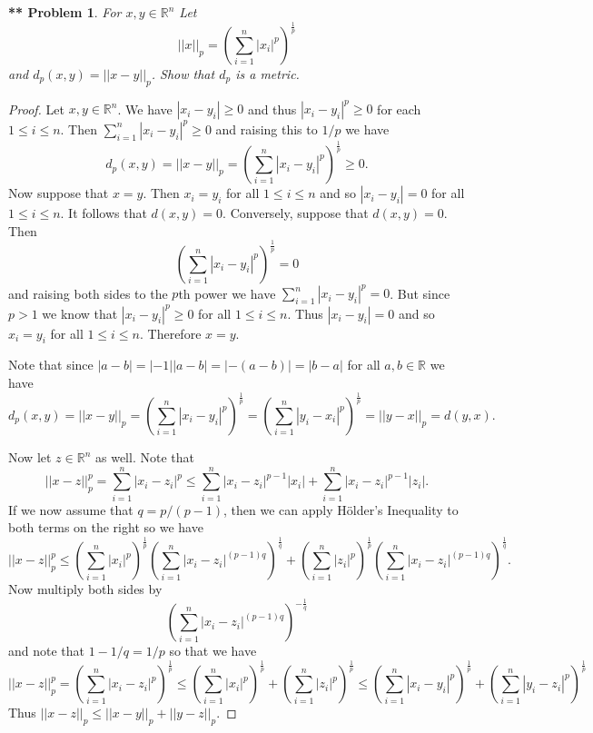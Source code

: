 \documentclass{article}
\newtheorem{**}{** Problem}
\begin{document}
\begin{flushleft}
\begin{**}
For $x, y \in \mathbb{R}^n$ Let
\[
||x||_p = \left ( \sum_{i=1}^{n} |x_i|^p \right )^{\frac{1}{p}}
\]
and $d_p (x,y) = ||x-y||_p$. Show that $d_p$ is a metric.
\end{**}
\begin{proof}
Let $x, y \in \mathbb{R}^n$. We have $|x_i-y_i| \geq 0$ and thus $|x_i-y_i|^p \geq 0$ for each $1 \leq i \leq n$. Then $\sum_{i=1}^n |x_i - y_i|^p \geq 0$ and raising this to $1/p$ we have
\[
d_p(x,y) = ||x-y||_p = \left ( \sum_{i=1}^{n} |x_i-y_i|^p \right )^{\frac{1}{p}} \geq 0.
\]
Now suppose that $x=y$. Then $x_i = y_i$ for all $1 \leq i \leq n$ and so $|x_i-y_i| = 0$ for all $1 \leq i \leq n$. It follows that $d(x,y) = 0$. Conversely, suppose that $d(x,y) = 0$. Then
\[
\left ( \sum_{i=1}^{n} |x_i-y_i|^p \right )^{\frac{1}{p}} = 0
\]
and raising both sides to the $p$th power we have $\sum_{i=1}^{n} |x_i-y_i|^p = 0$. But since $p > 1$ we know that $|x_i-y_i|^p \geq 0$ for all $1 \leq i \leq n$. Thus $|x_i-y_i| = 0$ and so $x_i = y_i$ for all $1 \leq i \leq n$. Therefore $x=y$.\newline

Note that since $|a-b| = |-1||a-b| = |-(a-b)| = |b-a|$ for all $a,b \in \mathbb{R}$ we have
\[
d_p(x,y) = ||x-y||_p = \left ( \sum_{i=1}^{n} |x_i-y_i|^p \right )^{\frac{1}{p}} = \left ( \sum_{i=1}^{n} |y_i-x_i|^p \right )^{\frac{1}{p}} = ||y-x||_p = d(y,x).
\]\newline

Now let $z \in \mathbb{R}^n$ as well. Note that
\[
||x-z||_p^p = \sum_{i=1}^{n} |x_i - z_i|^p \leq \sum_{i=1}^{n} |x_i - z_i|^{p-1}|x_i| + \sum_{i=1}^{n} |x_i - z_i|^{p-1}|z_i|.
\]
If we now assume that $q = p/(p-1)$, then we can apply H\"{o}lder's Inequality to both terms on the right so we have
\[
||x-z||_p^p \leq \left ( \sum_{i=1}^{n} |x_i|^p \right )^{\frac{1}{p}} \left ( \sum_{i=1}^{n} |x_i - z_i|^{(p-1)q} \right )^{\frac{1}{q}} + \left ( \sum_{i=1}^{n} |z_i|^p \right )^{\frac{1}{p}} \left ( \sum_{i=1}^{n} |x_i - z_i|^{(p-1)q} \right )^{\frac{1}{q}}.
\]
Now multiply both sides by
\[
\left ( \sum_{i=1}^{n} |x_i - z_i|^{(p-1)q} \right )^{-\frac{1}{q}}
\]
and note that $1 - 1/q = 1/p$ so that we have
\[
||x-z||_p^p = \left ( \sum_{i=1}^{n} |x_i - z_i|^p \right )^{\frac{1}{p}} \leq \left ( \sum_{i=1}^{n} |x_i|^p \right )^{\frac{1}{p}} + \left ( \sum_{i=1}^{n} |z_i|^p \right )^{\frac{1}{p}} \leq \left ( \sum_{i=1}^{n} |x_i-y_i|^p \right )^{\frac{1}{p}} + \left ( \sum_{i=1}^{n} |y_i-z_i|^p \right )^{\frac{1}{p}}
\]
Thus $||x-z||_p \leq ||x-y||_p + ||y-z||_p$.
\end{proof}


\end{flushleft}
\end{document}
